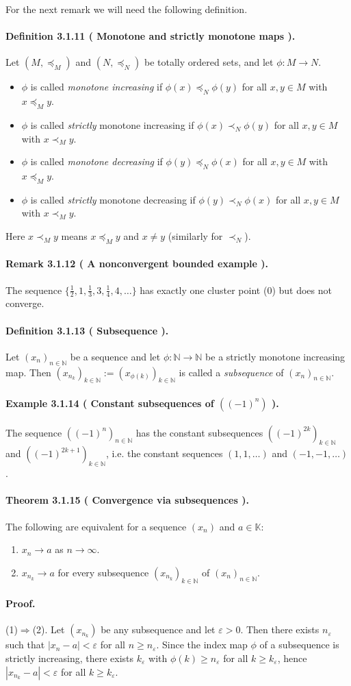 \documentclass[12pt,a4paper]{article}
\newcommand{\N}{\mathbb{N}}
\newcommand{\K}{\mathbb{K}} %
\newcommand{\eps}{\varepsilon}
\newcommand{\NumberedDefinition}[3]{%
\paragraph*{Definition #1 ( #2 ).} #3\par}
\newcommand{\NumberedTheorem}[3]{%
\paragraph*{Theorem #1 ( #2 ).} #3\par}
\newcommand{\NumberedExample}[3]{%
\paragraph*{Example #1 ( #2 ).} #3\par}
\newcommand{\NumberedRemark}[3]{%
\paragraph*{Remark #1 ( #2 ).} #3\par}
\theoremstyle{plain}
\theoremstyle{definition}
\theoremstyle{remark}
\begin{document}
For the next remark we will need the following definition.

\NumberedDefinition{3.1.11}{Monotone and strictly monotone maps}{Let $(M,\preceq_M)$ and $(N,\preceq_N)$ be totally ordered sets, and let $\phi: M\to N$.
\begin{itemize}[leftmargin=*]
	\item $\phi$ is called \emph{monotone increasing} if $\phi(x)\preceq_N \phi(y)$ for all $x,y\in M$ with $x\preceq_M y$.
	\item $\phi$ is called \emph{strictly} monotone increasing if $\phi(x)\prec_N \phi(y)$ for all $x,y\in M$ with $x\prec_M y$.
	\item $\phi$ is called \emph{monotone decreasing} if $\phi(y)\preceq_N \phi(x)$ for all $x,y\in M$ with $x\preceq_M y$.
	\item $\phi$ is called \emph{strictly} monotone decreasing if $\phi(y)\prec_N \phi(x)$ for all $x,y\in M$ with $x\prec_M y$.
\end{itemize}
Here $x\prec_M y$ means $x\preceq_M y$ and $x\ne y$ (similarly for $\prec_N$).}

\NumberedRemark{3.1.12}{A nonconvergent bounded example}{The sequence $\{\tfrac12,1,\tfrac13,3,\tfrac14,4,\dots\}$ has exactly one cluster point ($0$) but does not converge.}

\NumberedDefinition{3.1.13}{Subsequence}{Let $(x_n)_{n\in\N}$ be a sequence and let $\phi: \N\to\N$ be a strictly monotone increasing map. Then $(x_{n_k})_{k\in\N}:=(x_{\phi(k)})_{k\in\N}$ is called a \emph{subsequence} of $(x_n)_{n\in\N}$.}

\NumberedExample{3.1.14}{Constant subsequences of $((-1)^n)$}{The sequence $((-1)^n)_{n\in\N}$ has the constant subsequences $((-1)^{2k})_{k\in\N}$ and $((-1)^{2k+1})_{k\in\N}$, i.e. the constant sequences $(1,1,\dots)$ and $(-1,-1,\dots)$.}

\NumberedTheorem{3.1.15}{Convergence via subsequences}{The following are equivalent for a sequence $(x_n)$ and $a\in\K$:
\begin{enumerate}[label={(\arabic*)}, leftmargin=*]
	\item $x_n\to a$ as $n\to\infty$.
	\item $x_{n_k}\to a$ for every subsequence $(x_{n_k})_{k\in\N}$ of $(x_n)_{n\in\N}$.
\end{enumerate}}

\paragraph{Proof.} (1)$\Rightarrow$(2). Let $(x_{n_k})$ be any subsequence and let $\eps>0$. Then there exists $n_\eps$ such that $|x_n-a|<\eps$ for all $n\ge n_\eps$. Since the index map $\phi$ of a subsequence is strictly increasing, there exists $k_\eps$ with $\phi(k)\ge n_\eps$ for all $k\ge k_\eps$, hence $|x_{n_k}-a|<\eps$ for all $k\ge k_\eps$.
\end{document}
